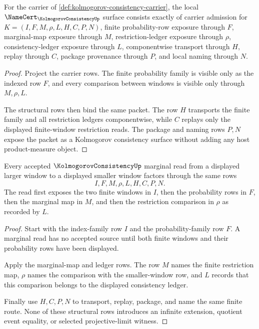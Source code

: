 \begin{theorem}
\label{thm:kolmogorov-consistency-obligation-surface}
For the carrier of \autoref{def:kolmogorov-consistency-carrier}, the local
$\NameCert_{\KolmogorovConsistencyUp}$ surface consists exactly of carrier
admission for $K=(I,F,M,\rho,L,H,C,P,N)$, finite probability-row exposure through
$F$, marginal-map exposure through $M$, restriction-ledger exposure through
$\rho$, consistency-ledger exposure through $L$, componentwise transport through
$H$, replay through $C$, package provenance through $P$, and local naming
through $N$.
\end{theorem}
\begin{proof}
Project the carrier rows. The finite probability family is visible only as the
indexed row $F$, and every comparison between windows is visible only through
$M,\rho,L$.

The structural rows then bind the same packet. The row $H$ transports the
finite family and all restriction ledgers componentwise, while $C$ replays only
the displayed finite-window restriction reads. The package and naming rows
$P,N$ expose the packet as a Kolmogorov consistency surface without adding any
host product-measure object.
\end{proof}

\begin{theorem}
\label{thm:kolmogorov-consistency-marginal-ledger}
Every accepted $\KolmogorovConsistencyUp$ marginal read from a displayed larger
window to a displayed smaller window factors through the same rows
$$
I,F,M,\rho,L,H,C,P,N.
$$
The read first exposes the two finite windows in $I$, then the probability rows
in $F$, then the marginal map in $M$, and then the restriction comparison in
$\rho$ as recorded by $L$.
\end{theorem}
\begin{proof}
Start with the index-family row $I$ and the probability-family row $F$. A
marginal read has no accepted source until both finite windows and their
probability rows have been displayed.

Apply the marginal-map and ledger rows. The row $M$ names the finite restriction
map, $\rho$ names the comparison with the smaller-window row, and $L$ records
that this comparison belongs to the displayed consistency ledger.

Finally use $H,C,P,N$ to transport, replay, package, and name the same finite
route. None of these structural rows introduces an infinite extension, quotient
event equality, or selected projective-limit witness.
\end{proof}

